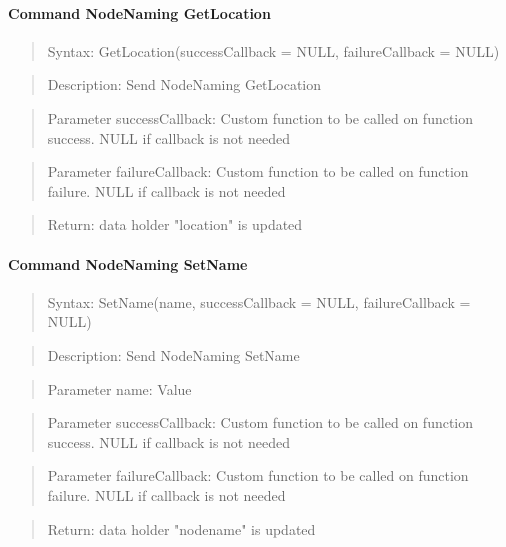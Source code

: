 \paragraph {Command NodeNaming GetLocation}
\begin{quote} Syntax: GetLocation(successCallback = NULL, failureCallback = NULL)\end{quote}
\begin{quote} Description: Send NodeNaming GetLocation\end{quote}
\begin{quote} Parameter successCallback: Custom function to be called on function success. NULL if callback is not needed\end{quote}
\begin{quote} Parameter failureCallback: Custom function to be called on function failure. NULL if callback is not needed\end{quote}
\begin{quote} Return: data holder "location" is updated\end{quote}

\paragraph {Command NodeNaming SetName}
\begin{quote} Syntax: SetName(name, successCallback = NULL, failureCallback = NULL)\end{quote}
\begin{quote} Description: Send NodeNaming SetName\end{quote}
\begin{quote} Parameter name: Value\end{quote}
\begin{quote} Parameter successCallback: Custom function to be called on function success. NULL if callback is not needed\end{quote}
\begin{quote} Parameter failureCallback: Custom function to be called on function failure. NULL if callback is not needed\end{quote}
\begin{quote} Return: data holder "nodename" is updated\end{quote}

